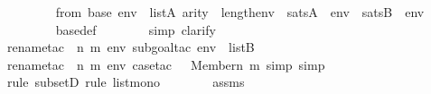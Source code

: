 \begin{isabellebody}
\ \ \ \ \isamarkupfalse%
\ {\isachardoublequoteopen}{\isasymforall}{\isasymphi}\ {\isasymin}\ {\isasymDelta}{}{\isacharunderscore}{\kern0pt}from{\isacharcircum}{\kern0pt}{}\ {\isacharparenleft}{\kern0pt}{\isasymDelta}{}{\isacharunderscore}{\kern0pt}base{\isacharparenright}{\kern0pt}{\isachardot}{\kern0pt}\ {\isacharparenleft}{\kern0pt}{\isasymforall}env\ {\isasymin}\ list{\isacharparenleft}{\kern0pt}A{\isacharparenright}{\kern0pt}{\isachardot}{\kern0pt}\ arity{\isacharparenleft}{\kern0pt}{\isasymphi}{\isacharparenright}{\kern0pt}\ {\isasymle}\ length{\isacharparenleft}{\kern0pt}env{\isacharparenright}{\kern0pt}\ {\isasymlongrightarrow}\ {\isacharparenleft}{\kern0pt}sats{\isacharparenleft}{\kern0pt}A{\isacharcomma}{\kern0pt}\ {\isasymphi}{\isacharcomma}{\kern0pt}\ env{\isacharparenright}{\kern0pt}\ {\isasymlongleftrightarrow}\ sats{\isacharparenleft}{\kern0pt}B{\isacharcomma}{\kern0pt}\ {\isasymphi}{\isacharcomma}{\kern0pt}\ env{\isacharparenright}{\kern0pt}{\isacharparenright}{\kern0pt}{\isacharparenright}{\kern0pt}{\isachardoublequoteclose}\ \isanewline
\ \ \ \ \ \ \isamarkupfalse%
\ {\isasymDelta}{}{\isacharunderscore}{\kern0pt}base{\isacharunderscore}{\kern0pt}def\isanewline
\ \ \ \ \ \ \isamarkupfalse%
\ {\isacharparenleft}{\kern0pt}simp{\isacharcomma}{\kern0pt}\ clarify{\isacharparenright}{\kern0pt}\isanewline
\ \ \ \ \ \ \isamarkupfalse%
{\isacharparenleft}{\kern0pt}rename{\isacharunderscore}{\kern0pt}tac\ {\isasymphi}\ n\ m\ env{\isacharcomma}{\kern0pt}\ subgoal{\isacharunderscore}{\kern0pt}tac\ {\isachardoublequoteopen}env\ {\isasymin}\ list{\isacharparenleft}{\kern0pt}B{\isacharparenright}{\kern0pt}{\isachardoublequoteclose}{\isacharparenright}{\kern0pt}\ \isanewline
\ \ \ \ \ \ \ \isamarkupfalse%
{\isacharparenleft}{\kern0pt}rename{\isacharunderscore}{\kern0pt}tac\ {\isasymphi}\ n\ m\ env{\isacharcomma}{\kern0pt}\ case{\isacharunderscore}{\kern0pt}tac\ {\isachardoublequoteopen}{\isasymphi}\ {\isacharequal}{\kern0pt}\ Member{\isacharparenleft}{\kern0pt}n{\isacharcomma}{\kern0pt}\ m{\isacharparenright}{\kern0pt}{\isachardoublequoteclose}{\isacharcomma}{\kern0pt}\ simp{\isacharcomma}{\kern0pt}\ simp{\isacharparenright}{\kern0pt}\isanewline
\ \ \ \ \ \ \isamarkupfalse%
{\isacharparenleft}{\kern0pt}rule\ subsetD{\isacharcomma}{\kern0pt}\ rule\ list{\isacharunderscore}{\kern0pt}mono{\isacharparenright}{\kern0pt}\isanewline
\ \ \ \ \ \ \isamarkupfalse%
\ assms\ \isanewline
\ \ \ \ \ \ \isamarkupfalse%

\end{isabellebody}

